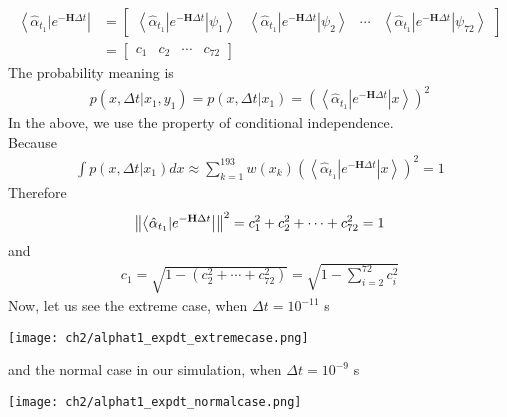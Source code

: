 \begin{definition}
\begin{align*}
        \left< \hat{\alpha}_{t_1}| e^{-\textbf{H}\Delta t} \right| &= 
        \begin{bmatrix}
                \left< \hat{\alpha}_{t_1}| e^{-\textbf{H}\Delta t} | \psi_1 \right> &
                \left< \hat{\alpha}_{t_1}| e^{-\textbf{H}\Delta t} | \psi_2 \right> & 
                \cdots &
                \left< \hat{\alpha}_{t_1}| e^{-\textbf{H}\Delta t} | \psi_{72} \right>
        \end{bmatrix}\\
        &=
        \begin{bmatrix}
                c_1 & c_2 & \cdots & c_{72}
        \end{bmatrix}   
\end{align*}
The probability meaning is 
\begin{align*}
        p(x, \Delta t | x_1, y_1) = p(x, \Delta t | x_1) = (\left< \hat{\alpha}_{t_1}| e^{-\textbf{H}\Delta t} | x \right>)^2
\end{align*}
In the above, we use the property of conditional independence. \\
Because 
\begin{align*}
        \int p(x, \Delta t | x_1) dx \approx \sum_{k=1}^{193}w(x_k)(\left< \hat{\alpha}_{t_1}| e^{-\textbf{H}\Delta t} | x \right>)^2= 1
\end{align*}
Therefore
\begin{align*}
        \left\lVert\left< \hat{\alpha}_{t_1}| e^{-\textbf{H}\Delta t} \right|\right\rVert^2 = c_1^2 + c_2^2 + \cdots + c_{72}^2 = 1
\end{align*}
and 
\begin{align*}
        c_1 = \sqrt{1 - (c_2^2 + \cdots + c_{72}^2)} = \sqrt{1- \sum_{i=2}^{72}c_i^2}
\end{align*}
Now, let us see the extreme case, when $\Delta t = 10^{-11}$ s
\begin{center}
        \texttt{[image: ch2/alphat1\_expdt\_extremecase.png]}   
\end{center}
and the normal case in our simulation, when $\Delta t = 10^{-9}$ s 
\begin{center}
        \texttt{[image: ch2/alphat1\_expdt\_normalcase.png]}   
\end{center}
\end{definition}

